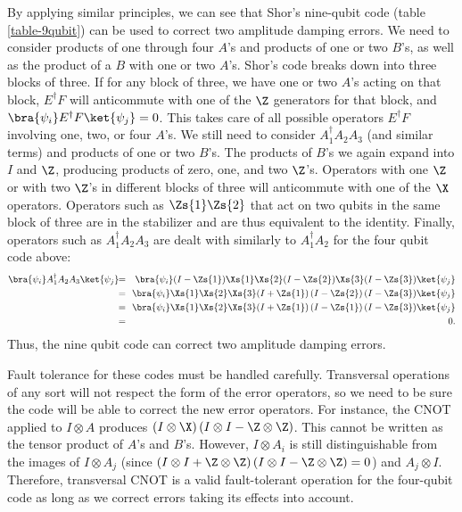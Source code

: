 By applying similar principles, we can see that Shor's nine-qubit code (table
\ref{table-9qubit}) can be used to correct two amplitude damping errors.
We need to consider products of one through four $A$'s and products of one
or two $B$'s, as well as the product of a $B$ with one or two $A$'s.  Shor's
code breaks down into three blocks of three.  If for any block of three,
we have one or two $A$'s acting on that block, $E^\dagger F$ will anticommute
with one of the $\Z$ generators for that block, and $\bra{\psi_i} E^\dagger
F \ket{\psi_j} = 0$.  This takes care of all possible operators $E^\dagger F$
involving one, two, or four $A$'s.  We still need to consider $A_1^\dagger A_2
A_3$ (and similar terms) and products of one or two $B$'s.  The products of
$B$'s we again expand into $I$ and $\Z$, producing products of zero, one, and
two $\Z$'s.  Operators with one $\Z$ or with two $\Z$'s in different blocks of
three will anticommute with one of the $\X$ operators.  Operators such as
$\Zs{1} \Zs{2}$ that act on two qubits in the same block of three are in the
stabilizer and are thus equivalent to the identity.  Finally, operators such as
$A_1^\dagger A_2 A_3$ are dealt with similarly to $A_1^\dagger A_2$ for the
four qubit code above:
\begin{eqnarray}
	\bra{\psi_i} A_1^\dagger A_2 A_3 \ket{\psi_j} & \!\! = &
	\!\! \bra{\psi_i} (I - \Zs{1}) \Xs{1} \Xs{2} (I - \Zs{2}) \Xs{3} (I - \Zs{3})
	\ket{\psi_j} \\
	& \!\! = & \!\! \bra{\psi_i} \Xs{1} \Xs{2} \Xs{3} (I + \Zs{1})\,(I - \Zs{2})\,
	(I - \Zs{3}) \ket{\psi_j} \\
	& \!\! = & \!\! \bra{\psi_i} \Xs{1} \Xs{2} \Xs{3} (I + \Zs{1})\,(I - \Zs{1})\,
	(I - \Zs{3}) \ket{\psi_j} \\
	& \!\! = & \!\! 0.
\end{eqnarray}
Thus, the nine qubit code can correct two amplitude damping errors.

Fault tolerance for these codes must be handled carefully.  Transversal
operations of any sort will not respect the form of the error operators, so
we need to be sure the code will be able to correct the new error operators.
For instance, the CNOT applied to $I \otimes A$ produces $(I \otimes \X)\,
(I \otimes I - \Z \otimes \Z)$.  This cannot be written as the tensor product
of $A$'s and $B$'s.  However, $I \otimes A_i$ is still distinguishable from the
images of $I \otimes A_j$ (since $(I \otimes I + \Z \otimes \Z)\,(I \otimes I
- \Z \otimes \Z) = 0$) and $A_j \otimes I$.  Therefore, transversal CNOT is
a valid fault-tolerant operation for the four-qubit code as long as we correct
errors taking its effects into account.

